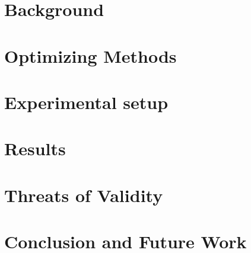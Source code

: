 \documentclass[conference,10pt]{IEEEtran}
\begin{document}
\section{Background}
\label{sec:background}



\section{Optimizing Methods}
\label{sec:method}




\section{Experimental setup}
\label{sec:experiments}





\section{Results}
\label{sec:results}



\section{Threats of Validity}
\label{sec:threats}




\section{Conclusion and Future Work}
\label{sec:conclusion}


\balance


\end{document}
